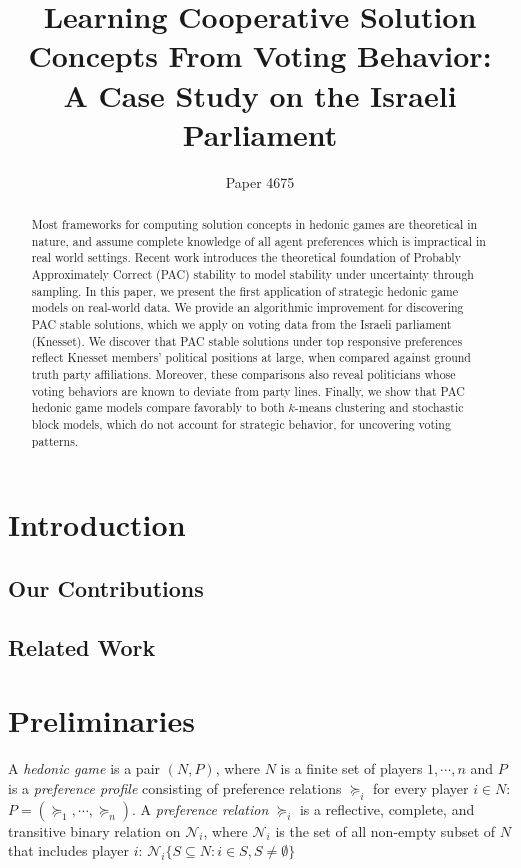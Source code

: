 \documentclass[letterpaper]{article} %
\title{Learning Cooperative Solution Concepts From Voting Behavior:\\ A Case Study on the Israeli Parliament}
\author{Paper 4675}
\theoremstyle{definition}
\begin{document}
\maketitle

\begin{abstract}
Most frameworks for computing solution concepts in hedonic games are theoretical in nature, and assume complete knowledge of all agent preferences which is impractical in real world settings.
Recent work introduces the theoretical foundation of Probably Approximately Correct (PAC) stability to model stability under uncertainty through sampling.
In this paper, we present the first application of strategic hedonic game models on real-world data.
We provide an algorithmic improvement for discovering PAC stable solutions, which we apply on voting data from the Israeli parliament (Knesset). 
We discover that PAC stable solutions under top responsive preferences reflect Knesset members' political positions at large, when compared against ground truth party affiliations.
Moreover, these comparisons also reveal politicians whose voting behaviors are known to deviate from party lines.
Finally, we show that PAC hedonic game models compare favorably to both $k$-means clustering and stochastic block models, which do not account for strategic behavior, for uncovering voting patterns.
\end{abstract}

\section{Introduction}\label{sec:intro}
\subsection{Our Contributions}\label{sec:contrib}
\subsection{Related Work}\label{sec:related}

\section{Preliminaries}\label{sec:prelim}

A {\it hedonic game} is a pair $(N, P)$, where $N$ is a finite set of players $1, \cdots, n$ and $P$ is a {\it preference profile} consisting of preference relations $\succeq_i$ for every player $i \in N$: $P = (\succeq_1, \cdots, \succeq_n)$. A {\it preference relation} $\succeq_i$ is a reflective, complete, and transitive binary relation on $\mathcal{N}_i$, where $\mathcal{N}_i$ is the set of all non-empty subset of $N$ that includes player $i$: $\mathcal{N}_i \{S \subseteq N: i \in S, S \neq \emptyset \}$
\end{document}
